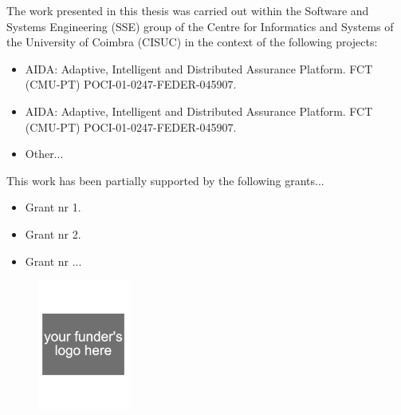 \thispagestyle{plain}

\vspace*{\fill}

The work presented in this thesis was carried out within the Software and Systems Engineering (SSE) group of the Centre for Informatics and Systems of the University of Coimbra (CISUC) in the context of the following projects:

\begin{itemize}
	\item AIDA: Adaptive, Intelligent and Distributed Assurance Platform. FCT (CMU-PT) POCI-01-0247-FEDER-045907.
	\item AIDA: Adaptive, Intelligent and Distributed Assurance Platform. FCT (CMU-PT) POCI-01-0247-FEDER-045907.	
	\item Other...		
\end{itemize}

This work has been partially supported by the following grants...

\begin{itemize}
	\item Grant nr 1.
	\item Grant nr 2.	
	\item Grant nr ...	
\end{itemize}
\vspace*{\fill}

\begin{figure}[!hb]
		\centering
		\includegraphics[width=3cm]{frontmatter/sponsor1.pdf}
\end{figure}

